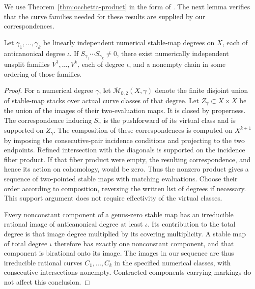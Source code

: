 We use Theorem~\ref{thm:occhetta-product} in the form of
\cite[Theorem~1.1]{Occhetta2006}.  The next lemma verifies that the curve
families needed for these results are supplied by our correspondences.

\begin{lemma}
\label{lem:minimum-degree-incidence}
Let $\gamma_1,\ldots,\gamma_k$ be linearly independent numerical
stable-map degrees on $X$, each of anticanonical degree $\iota$.
If $S_{\gamma_1}\cdots S_{\gamma_k}\ne0$, there exist numerically
independent unsplit families $V^1,\ldots,V^k$, each of degree $\iota$,
and a nonempty chain in some ordering of those families.
\end{lemma}

\begin{proof}
For a numerical degree $\gamma$, let
$\overline{\mathcal M}_{0,2}(X,\gamma)$ denote the finite disjoint
union of stable-map stacks over actual curve classes of that degree.
Let $Z_\gamma\subset X\times X$ be the union of the images of their
two-evaluation maps.
It is closed by properness.  The correspondence inducing $S_\gamma$
is the pushforward of its virtual class and is supported on
$Z_\gamma$.  The composition of these correspondences is computed
on $X^{k+1}$ by imposing the consecutive-pair incidence conditions
and projecting to the two endpoints.  Refined intersection with the
diagonals is supported on the incidence fiber product.  If that fiber
product were empty, the resulting correspondence, and hence its
action on cohomology, would be zero.  Thus the nonzero product gives
a sequence of two-pointed stable maps with matching evaluations.
Choose their order according to composition, reversing the written
list of degrees if necessary.  This support argument does not require
effectivity of the virtual classes.

Every nonconstant component of a genus-zero stable map has an
irreducible rational image of anticanonical degree at least $\iota$.
Its contribution to the total degree is that image degree multiplied
by its covering multiplicity.  A stable map of total degree $\iota$
therefore has exactly one nonconstant component, and that component
is birational onto its image.  The images in our sequence are thus
irreducible rational curves $C_1,\ldots,C_k$ in the specified
numerical classes, with consecutive intersections nonempty.
Contracted components carrying markings do not affect this conclusion.


\end{proof}
